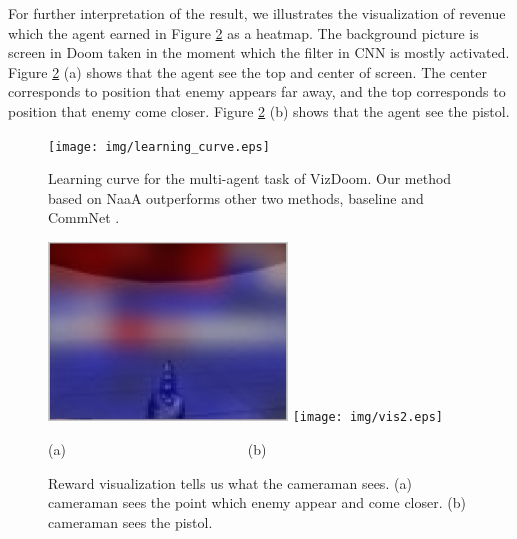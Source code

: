 For further interpretation of the result, 
we illustrates the visualization of revenue which the agent earned in Figure \ref{fig:vis} as a heatmap.
The background picture is screen in Doom taken in the moment which the filter in CNN is mostly activated.
Figure \ref{fig:vis} (a) shows that the agent see the top and center of screen.
The center corresponds to position that enemy appears far away, 
and the top corresponds to position that enemy come closer.
Figure \ref{fig:vis} (b) shows that the agent see the pistol.

\begin{figure}[t]
\centering
\texttt{[image: img/learning\_curve.eps]}
\caption{
Learning curve for the multi-agent task of VizDoom. 
Our method based on NaaA outperforms other two methods, baseline and CommNet \citep{sukhbaatar2016learning}.
}
\label{fig:learning_curve}
\end{figure}

\begin{figure}[t]
\centering
\includegraphics[width=2.5in]{img/vis1.eps}
\centering
\texttt{[image: img/vis2.eps]}

(a)
\,\, \,\, \,\, \,\, \,\, \,\, \,\, \,\, \,\, \,\, \,\, \,\, \,\, \,\, \,\, \,\, \,\, \,\, \,\,
(b)
\caption{
Reward visualization tells us what the cameraman sees. 
(a) cameraman sees the point which enemy appear and come closer.
(b) cameraman sees the pistol.
}
\label{fig:vis}
\end{figure}


